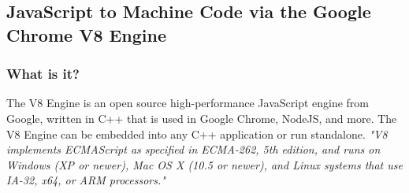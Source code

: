 \subsection{JavaScript to Machine Code via the Google Chrome V8 Engine}
	\subsubsection{What is it?}
    	The V8 Engine is an open source high-performance JavaScript engine from Google, written in C++ that is used in Google Chrome, NodeJS, and more. The V8 Engine can be embedded into any C++ application or run standalone\cite{googleV8}. \emph{"V8 implements ECMAScript as specified in ECMA-262, 5th edition, and runs on Windows (XP or newer), Mac OS X (10.5 or newer), and Linux systems that use IA-32, x64, or ARM processors."}\cite{googleV8} 
